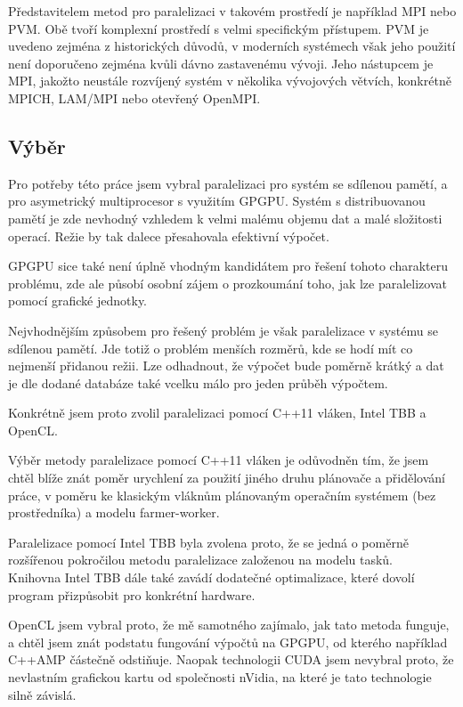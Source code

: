 \documentclass[]{thesiskiv}
\begin{document}
Představitelem metod pro paralelizaci v takovém prostředí je například MPI nebo PVM. Obě tvoří komplexní prostředí s velmi specifickým přístupem. PVM je uvedeno zejména z historických důvodů, v moderních systémech však jeho použití není doporučeno zejména kvůli dávno zastavenému vývoji. Jeho nástupcem je MPI, jakožto neustále rozvíjený systém v několika vývojových větvích, konkrétně MPICH, LAM/MPI nebo otevřený OpenMPI.

\subsection{Výběr}

Pro potřeby této práce jsem vybral paralelizaci pro systém se sdílenou pamětí, a pro asymetrický multiprocesor s využitím GPGPU. Systém s distribuovanou pamětí je zde nevhodný vzhledem k velmi malému objemu dat a malé složitosti operací. Režie by tak dalece přesahovala efektivní výpočet.

GPGPU sice také není úplně vhodným kandidátem pro řešení tohoto charakteru problému, zde ale působí osobní zájem o prozkoumání toho, jak lze paralelizovat pomocí grafické jednotky.

Nejvhodnějším způsobem pro řešený problém je však paralelizace v systému se sdílenou pamětí. Jde totiž o problém menších rozměrů, kde se hodí mít co nejmenší přidanou režii. Lze odhadnout, že výpočet bude poměrně krátký a dat je dle dodané databáze také vcelku málo pro jeden průběh výpočtem.

Konkrétně jsem proto zvolil paralelizaci pomocí C++11 vláken, Intel TBB a OpenCL.

Výběr metody paralelizace pomocí C++11 vláken je odůvodněn tím, že jsem chtěl blíže znát poměr urychlení za použití jiného druhu plánovače a přidělování práce, v poměru ke klasickým vláknům plánovaným operačním systémem (bez prostředníka) a modelu farmer-worker.

Paralelizace pomocí Intel TBB byla zvolena proto, že se jedná o poměrně rozšířenou pokročilou metodu paralelizace založenou na modelu tasků.\\ Knihovna Intel TBB dále také zavádí dodatečné optimalizace, které dovolí program přizpůsobit pro konkrétní hardware.

OpenCL jsem vybral proto, že mě samotného zajímalo, jak tato metoda funguje, a chtěl jsem znát podstatu fungování výpočtů na GPGPU, od kterého například C++AMP částečně odstiňuje. Naopak technologii CUDA jsem nevybral proto, že nevlastním grafickou kartu od společnosti nVidia, na které je tato technologie silně závislá.
\end{document}
